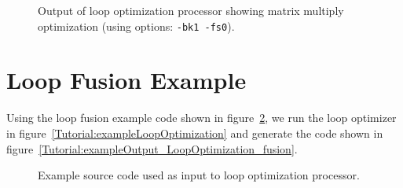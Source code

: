 \begin{figure}[!h]
{\indent
{\mySmallFontSize


\begin{latexonly}
   
\end{latexonly}

\begin{htmlonly}
   
\end{htmlonly}

}
}
\caption{Output of loop optimization processor showing matrix multiply
         optimization (using options: {\tt -bk1 -fs0}).}
\label{Tutorial:exampleOutput_LoopOptimization}
\end{figure}


\clearpage
\section{Loop Fusion Example}

   Using the loop fusion example code shown in 
figure~\ref{Tutorial:exampleInputCode_LoopOptimization_fusion}, we run the loop optimizer in
figure~\ref{Tutorial:exampleLoopOptimization} and generate the code shown in 
figure~\ref{Tutorial:exampleOutput_LoopOptimization_fusion}.

\begin{figure}[!h]
{\indent
{\mySmallFontSize


\begin{latexonly}
   
\end{latexonly}

\begin{htmlonly}
   
\end{htmlonly}

}
}
\caption{Example source code used as input to loop optimization processor.}
\label{Tutorial:exampleInputCode_LoopOptimization_fusion}
\end{figure}

